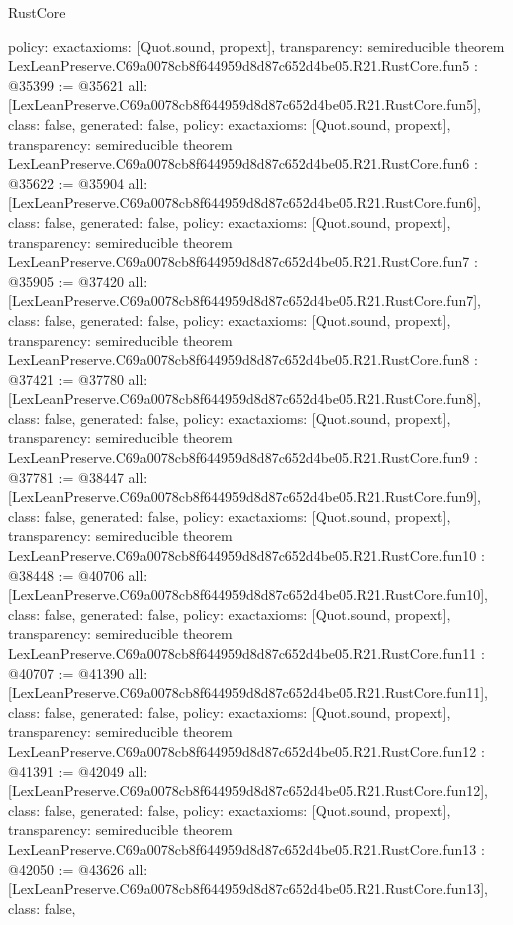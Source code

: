\begin{lexlean}{RustCore}
\begin{coremodule}
{  policy: exact{axioms: [Quot.sound, propext]},
  transparency: semireducible
}
theorem LexLeanPreserve.C69a0078cb8f644959d8d87c652d4be05.R21.RustCore.fun5 : @35399 := @35621 {
  all: [LexLeanPreserve.C69a0078cb8f644959d8d87c652d4be05.R21.RustCore.fun5],
  class: false,
  generated: false,
  policy: exact{axioms: [Quot.sound, propext]},
  transparency: semireducible
}
theorem LexLeanPreserve.C69a0078cb8f644959d8d87c652d4be05.R21.RustCore.fun6 : @35622 := @35904 {
  all: [LexLeanPreserve.C69a0078cb8f644959d8d87c652d4be05.R21.RustCore.fun6],
  class: false,
  generated: false,
  policy: exact{axioms: [Quot.sound, propext]},
  transparency: semireducible
}
theorem LexLeanPreserve.C69a0078cb8f644959d8d87c652d4be05.R21.RustCore.fun7 : @35905 := @37420 {
  all: [LexLeanPreserve.C69a0078cb8f644959d8d87c652d4be05.R21.RustCore.fun7],
  class: false,
  generated: false,
  policy: exact{axioms: [Quot.sound, propext]},
  transparency: semireducible
}
theorem LexLeanPreserve.C69a0078cb8f644959d8d87c652d4be05.R21.RustCore.fun8 : @37421 := @37780 {
  all: [LexLeanPreserve.C69a0078cb8f644959d8d87c652d4be05.R21.RustCore.fun8],
  class: false,
  generated: false,
  policy: exact{axioms: [Quot.sound, propext]},
  transparency: semireducible
}
theorem LexLeanPreserve.C69a0078cb8f644959d8d87c652d4be05.R21.RustCore.fun9 : @37781 := @38447 {
  all: [LexLeanPreserve.C69a0078cb8f644959d8d87c652d4be05.R21.RustCore.fun9],
  class: false,
  generated: false,
  policy: exact{axioms: [Quot.sound, propext]},
  transparency: semireducible
}
theorem LexLeanPreserve.C69a0078cb8f644959d8d87c652d4be05.R21.RustCore.fun10 : @38448 := @40706 {
  all: [LexLeanPreserve.C69a0078cb8f644959d8d87c652d4be05.R21.RustCore.fun10],
  class: false,
  generated: false,
  policy: exact{axioms: [Quot.sound, propext]},
  transparency: semireducible
}
theorem LexLeanPreserve.C69a0078cb8f644959d8d87c652d4be05.R21.RustCore.fun11 : @40707 := @41390 {
  all: [LexLeanPreserve.C69a0078cb8f644959d8d87c652d4be05.R21.RustCore.fun11],
  class: false,
  generated: false,
  policy: exact{axioms: [Quot.sound, propext]},
  transparency: semireducible
}
theorem LexLeanPreserve.C69a0078cb8f644959d8d87c652d4be05.R21.RustCore.fun12 : @41391 := @42049 {
  all: [LexLeanPreserve.C69a0078cb8f644959d8d87c652d4be05.R21.RustCore.fun12],
  class: false,
  generated: false,
  policy: exact{axioms: [Quot.sound, propext]},
  transparency: semireducible
}
theorem LexLeanPreserve.C69a0078cb8f644959d8d87c652d4be05.R21.RustCore.fun13 : @42050 := @43626 {
  all: [LexLeanPreserve.C69a0078cb8f644959d8d87c652d4be05.R21.RustCore.fun13],
  class: false,
}
\end{coremodule}
\end{lexlean}
